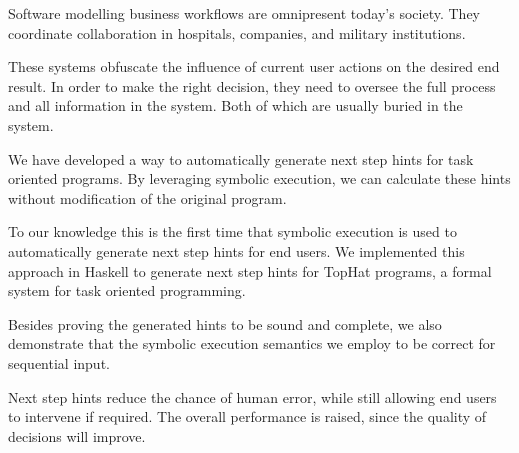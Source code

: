 
Software modelling business workflows are omnipresent today's society.
They coordinate collaboration in hospitals, companies, and military institutions.

These systems obfuscate the influence of current user actions on the desired end result.
In order to make the right decision, they need to oversee the full process and all information in the system.
Both of which are usually buried in the system.

We have developed a way to automatically generate next step hints for task oriented programs.
By leveraging symbolic execution, we can calculate these hints without modification of the original program.


To our knowledge this is the first time that symbolic execution is used to automatically generate next step hints for end users.
We implemented this approach in Haskell to generate next step hints for TopHat programs, a formal system for task oriented programming.

Besides proving the generated hints to be sound and complete, we also demonstrate that the symbolic execution semantics we employ to be correct for sequential input.

Next step hints reduce the chance of human error, while still allowing end users to intervene if required.
The overall performance is raised, since the quality of decisions will improve.


